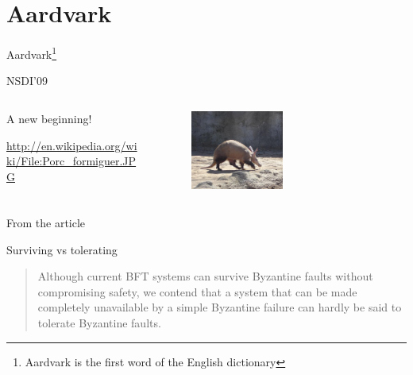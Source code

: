 \section{Aardvark}

\begin{frame}{Aardvark\footnote{Aardvark is the first word of the English dictionary}}
	
\begin{block}{NSDI'09}
{\small
{}
}
\end{block}	
	
\begin{columns}
\begin{column}{0.4\textwidth}
\BIL
\item A new beginning!
\item {\tiny \url{http://en.wikipedia.org/wiki/File:Porc_formiguer.JPG}}

\EIL
\end{column}
\begin{column}{0.6\textwidth}
\begin{figure}
	\includegraphics[width=0.5\textwidth]{figs/17/aardvark.png}\\
\end{figure}
\end{column}
\end{columns}


\end{frame}

\begin{frame}{From the article}

\begin{block}{Surviving vs tolerating}
\begin{quote}
Although current BFT systems can survive Byzantine faults without
compromising safety, we contend that a system that can be made completely
unavailable by a simple Byzantine failure can hardly be said to tolerate
Byzantine faults.
\end{quote}
\end{block}

\end{frame}

